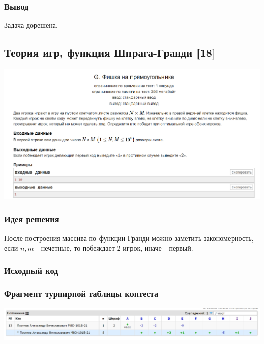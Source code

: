 \subsubsection*{Вывод}
Задача дорешена.

\vspace{20pt}

\pagebreak

\subsection*{Теория игр, функция Шпрага-Гранди [18]}
\begin{center}
\includegraphics[width=\textwidth]{statements/20.png}
\end{center}
\subsubsection*{Идея решения}
После построения массива по функции Гранди можно заметить закономерность, если $n, m$ - нечетные, то побеждает 2 игрок, иначе - первый.
\subsubsection*{Исходный код}


\subsubsection*{Фрагмент турнирной таблицы контеста}
\begin{center}
\includegraphics[width=\textwidth]{standings/20.png}\newline\noindent
\end{center}

